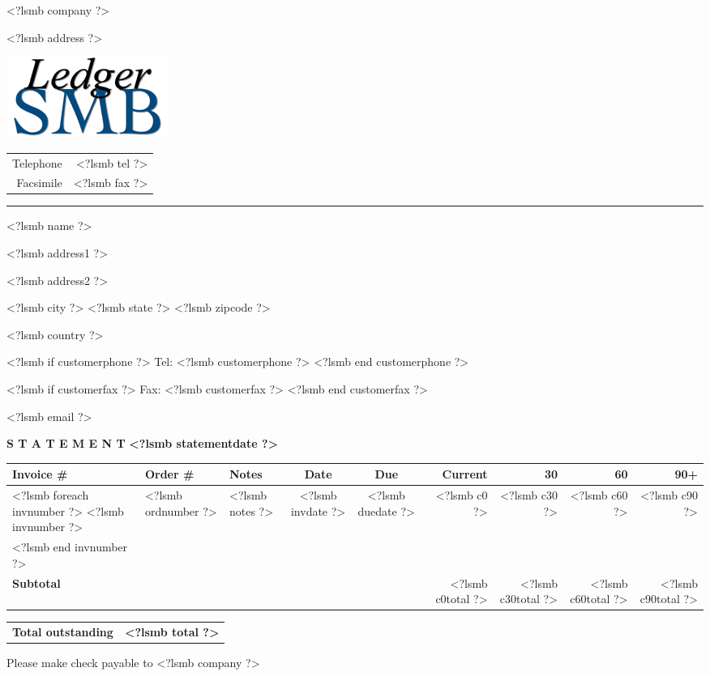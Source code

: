 \documentclass[english,twoside]{scrartcl}
\begin{document}
\pagestyle{myheadings}
\thispagestyle{empty}

\newlength{\descrwidth}\setlength{\descrwidth}{10cm}
\fontsize{10pt}{12pt}\selectfont

\vspace*{-1.3cm}

\parbox{\textwidth}{%
  \parbox[b]{.42\textwidth}{%
    <?lsmb company ?>

    <?lsmb address ?>
  }
  \parbox[b]{.2\textwidth}{
    \includegraphics[scale=0.3]{ledger-smb}
  }\hfill
  \begin{tabular}[b]{rr@{}}
  Telephone & <?lsmb tel ?>\\
  Facsimile & <?lsmb fax ?>
  \end{tabular}

  \rule[1.5em]{\textwidth}{0.5pt}
}

  
\vspace*{0.5cm}

\parbox[t]{1cm}{\hfill}
\parbox[t]{.45\textwidth}{
<?lsmb name ?>

<?lsmb address1 ?>

<?lsmb address2 ?>

<?lsmb city ?> <?lsmb state ?> <?lsmb zipcode ?>

<?lsmb country ?>
}
\parbox[t]{.45\textwidth}{
<?lsmb if customerphone ?>
Tel: <?lsmb customerphone ?>
<?lsmb end customerphone ?>

<?lsmb if customerfax ?>
Fax: <?lsmb customerfax ?>
<?lsmb end customerfax ?>

<?lsmb email ?>
}
\hfill

\vspace{1cm}

\textbf{S T A T E M E N T} \hfill \textbf{<?lsmb statementdate ?>}

\vspace{2cm}

\begin{tabularx}{\textwidth}{|llXccrrrr|}
  \hline
  \textbf{Invoice \#} & \textbf{Order \#} & \textbf{Notes} &
  \textbf{Date} & \textbf{Due} &
  \textbf{Current} & \textbf{30} & \textbf{60} & \textbf{90+} \\
  \hline
<?lsmb foreach invnumber ?>
  <?lsmb invnumber ?> & <?lsmb ordnumber ?> & <?lsmb notes ?> & <?lsmb invdate ?> & <?lsmb duedate ?> &
  <?lsmb c0 ?> & <?lsmb c30 ?> & <?lsmb c60 ?> & <?lsmb c90 ?> \\
<?lsmb end invnumber ?>
  \multicolumn{9}{|l|}{\mbox{}} \\
  \hline
  \textbf{Subtotal} & & & & & <?lsmb c0total ?> & <?lsmb c30total ?> & <?lsmb c60total ?> & <?lsmb c90total ?> \\
  \hline
\end{tabularx}

\vspace{0.5cm}

\hfill
\begin{tabularx}{.4\textwidth}{Xr@{}}
  \textbf{Total outstanding} & \textbf{<?lsmb total ?>}
\end{tabularx}

\vfill

Please make check payable to <?lsmb company ?>
\end{document}
